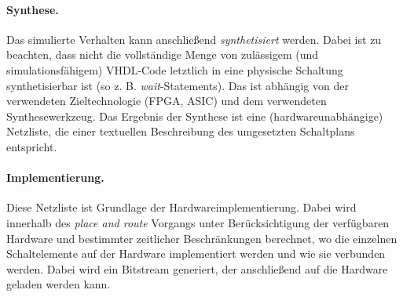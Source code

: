 \paragraph{Synthese.} Das simulierte Verhalten kann anschließend \emph{synthetisiert} werden. Dabei ist zu beachten, dass nicht die vollständige Menge von zulässigem (und simulationsfähigem) VHDL-Code letztlich in eine physische Schaltung synthetisierbar ist (so z. B. \emph{wait}-Statements). Das ist abhängig von der verwendeten Zieltechnologie (FPGA, ASIC) und dem verwendeten Synthesewerkzeug. Das Ergebnis der Synthese ist eine (hardwareunabhängige) Netzliste, die einer textuellen Beschreibung des umgesetzten Schaltplans entspricht.

\paragraph{Implementierung.} Diese Netzliste ist Grundlage der Hardwareimplementierung. Dabei wird innerhalb des \emph{place and route} Vorgangs unter Berücksichtigung der verfügbaren Hardware und bestimmter zeitlicher Beschränkungen berechnet, wo die einzelnen Schaltelemente auf der Hardware implementiert werden und wie sie verbunden werden. Dabei wird ein Bitstream generiert, der anschließend auf die Hardware geladen werden kann. \cite[S. 21]{SynthesisFPGA}
